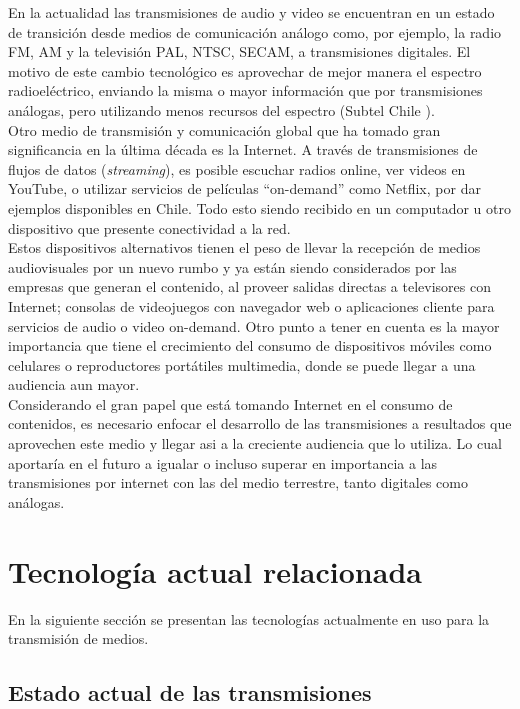 En la actualidad las transmisiones de audio y video se encuentran en un estado de transición desde medios de comunicación análogo como, por ejemplo, la radio FM, AM y la televisión PAL, NTSC, SECAM, a transmisiones digitales. El motivo de este cambio tecnológico es aprovechar de mejor manera el espectro radioeléctrico, enviando la misma o mayor información que por transmisiones análogas, pero utilizando menos recursos del espectro (Subtel Chile \cite{sota:subtel}).\\

Otro medio de transmisión y comunicación global que ha tomado gran significancia en la última década es la Internet. A través de transmisiones de flujos de datos (\textit{streaming}), es posible escuchar radios online, ver videos en YouTube, o utilizar servicios de películas “on-demand” como Netflix, por dar ejemplos disponibles en Chile. Todo esto siendo recibido en un computador u otro dispositivo que presente conectividad a la red.\\

Estos dispositivos alternativos tienen el peso de llevar la recepción de medios audiovisuales por un nuevo rumbo y ya están siendo considerados por las empresas que generan el contenido, al proveer salidas directas a televisores con Internet; consolas de videojuegos con navegador web o aplicaciones cliente para servicios de audio o video on-demand. Otro punto a tener en cuenta es la mayor importancia que tiene el crecimiento del consumo de dispositivos móviles como celulares o reproductores portátiles multimedia, donde se puede llegar a una audiencia aun mayor.\\

Considerando el gran papel que está tomando Internet en el consumo de contenidos, es necesario enfocar el desarrollo de las transmisiones a resultados que aprovechen este medio y llegar asi a la creciente audiencia que lo utiliza. 
Lo cual aportaría en el futuro a igualar o incluso superar en importancia a las transmisiones por internet con las del medio terrestre, tanto digitales como análogas.

\clearpage
\section{Tecnología actual relacionada}
En la siguiente sección se presentan las tecnologías actualmente en uso para la transmisión de medios.

\subsection{Estado actual de las transmisiones}

